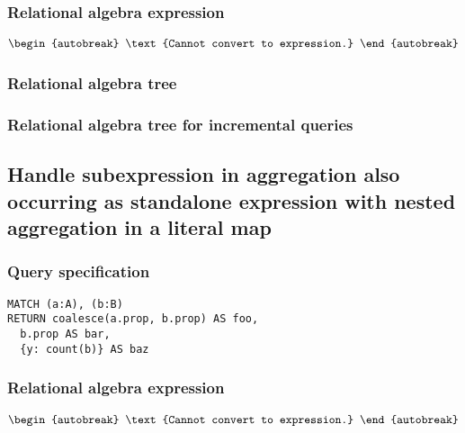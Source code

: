\subsubsection*{Relational algebra expression}

\begin{align*}
\begin{autobreak}
\text{Cannot convert to expression.}
\end{autobreak}
\end{align*}

\subsubsection*{Relational algebra tree}


\subsubsection*{Relational algebra tree for incremental queries}


\subsection{Handle subexpression in aggregation also occurring as standalone expression with nested aggregation in a literal map}

\subsubsection*{Query specification}

\begin{lstlisting}
MATCH (a:A), (b:B)
RETURN coalesce(a.prop, b.prop) AS foo,
  b.prop AS bar,
  {y: count(b)} AS baz
\end{lstlisting}

\subsubsection*{Relational algebra expression}

\begin{align*}
\begin{autobreak}
\text{Cannot convert to expression.}
\end{autobreak}
\end{align*}

